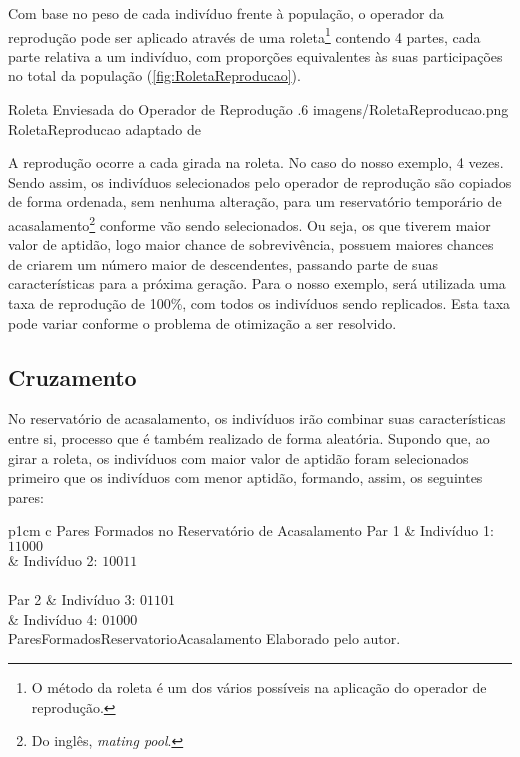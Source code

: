 Com base no peso de cada indivíduo frente à população, o operador da reprodução pode ser aplicado através de uma roleta\footnote{O método da roleta é um dos vários possíveis na aplicação do operador de reprodução.} contendo 4 partes, cada parte relativa a um indivíduo, com proporções equivalentes às suas participações no total da população (\autoref{fig:RoletaReproducao}).

\figura
	{Roleta Enviesada do Operador de Reprodução}
	{.6}
	{imagens/RoletaReproducao.png}
	{RoletaReproducao}
	{adaptado de \citet[p.11]{goldberg_genetic_1989}}

A reprodução ocorre a cada girada na roleta. No caso do nosso exemplo, 4 vezes. Sendo assim, os indivíduos selecionados pelo operador de reprodução são copiados de forma ordenada, sem nenhuma alteração, para um reservatório temporário de acasalamento\footnote{Do inglês, \textit{mating pool}.} conforme vão sendo selecionados. Ou seja, os que tiverem maior valor de aptidão, logo maior chance de sobrevivência, possuem maiores chances de criarem um número maior de descendentes, passando parte de suas características para a próxima geração. Para o nosso exemplo, será utilizada uma taxa de reprodução de 100\%, com todos os indivíduos sendo replicados. Esta taxa pode variar conforme o problema de otimização a ser resolvido.

\subsection{Cruzamento}

No reservatório de acasalamento, os indivíduos irão combinar suas características entre si, processo que é também realizado de forma aleatória. Supondo que, ao girar a roleta, os indivíduos com maior valor de aptidão foram selecionados primeiro que os indivíduos com menor aptidão, formando, assim, os seguintes pares:

\tabelamultilinhas
	{p{1cm} c}
	{Pares Formados no Reservatório de Acasalamento}
	{%
			{Par 1} %
				& Indivíduo 1: $11000$ \\ %
				& Indivíduo 2: $10011$ \\ \hline \\ %
			{Par 2} %
				& Indivíduo 3: $01101$ \\ %
				& Indivíduo 4: $01000$ \\ \hline %
	}
	{ParesFormadosReservatorioAcasalamento}
	{Elaborado pelo autor.}
        
